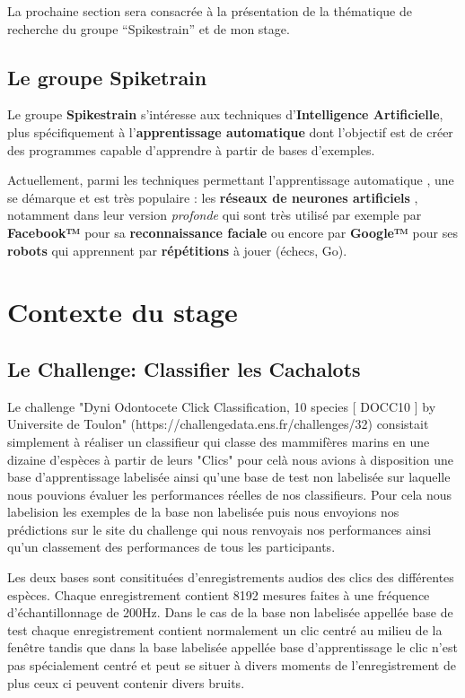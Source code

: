 La prochaine section sera consacrée à la présentation de la thématique
de recherche du groupe ``Spikestrain'' et de mon stage.


\hypertarget{Objectif_Spike}{%
\subsection{Le groupe Spiketrain}\label{Groupe_Spiketrain}}

Le groupe \textbf{Spikestrain} s'intéresse aux techniques
d'\textbf{Intelligence Artificielle}, plus spécifiquement à
l'\textbf{apprentissage automatique} dont l'objectif est de créer des
programmes capable d'apprendre à partir de bases d'exemples.

Actuellement, parmi les techniques permettant l'apprentissage
automatique , une se démarque et est très populaire : les
\textbf{réseaux de neurones artificiels} , notamment dans leur version
\emph{profonde} qui sont très utilisé par exemple par \textbf{Facebook™}
pour sa \textbf{reconnaissance faciale} ou encore par \textbf{Google™}
pour ses \textbf{robots} qui apprennent par \textbf{répétitions} à jouer
(échecs, Go).


\hypertarget{Contexte}{%
\section{Contexte du stage}\label{Contexte}}

\hypertarget{Le-Challenge}{%
\subsection{Le Challenge: Classifier les Cachalots}\label{Le-Challenge}}

Le challenge "Dyni Odontocete Click Classification, 10 species [ DOCC10 ]
by Universite de Toulon" (https://challengedata.ens.fr/challenges/32) consistait simplement à réaliser un classifieur qui classe des mammifères marins en une dizaine d'espèces à partir de leurs "Clics" pour celà nous avions à disposition une base d'apprentissage labelisée ainsi qu'une base de test non labelisée sur laquelle nous pouvions évaluer les performances réelles de nos classifieurs. Pour cela nous labelision les exemples de la base non labelisée puis nous envoyions nos prédictions sur le site du challenge qui nous renvoyais nos performances ainsi qu'un classement des performances de tous les participants.

Les deux bases sont consitituées d'enregistrements audios des clics des différentes espèces. Chaque enregistrement contient 8192 mesures faites à une fréquence d'échantillonnage de 200Hz. Dans le cas de la base non labelisée appellée base de test chaque enregistrement contient normalement un clic centré au milieu de la fenêtre tandis que dans la base labelisée appellée base d'apprentissage le clic n'est pas spécialement centré et peut se situer à divers moments de l'enregistrement de plus ceux ci peuvent contenir divers bruits.

